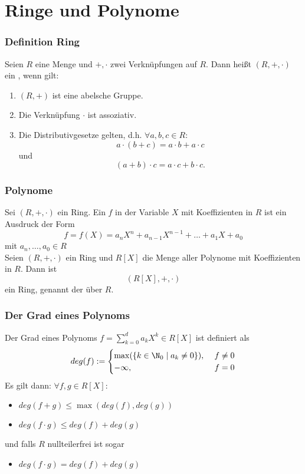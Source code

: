 \section{Ringe und Polynome}
%
%
\begin{frame}\frametitle{Definition Ring}
	
	Seien $R$ eine Menge und $+, \cdot$ zwei Verkn\"upfungen auf $R$. 
	Dann hei{\ss}t $(R,+,\cdot)$ ein , wenn gilt:
	\begin{enumerate}
		\item $(R,+)$ ist eine abelsche Gruppe.
		\item Die Verkn\"upfung $\cdot$ ist assoziativ.
		\item Die Distributivgesetze gelten, d.h. $\forall a,b,c \in R$:
			$$
				a\cdot (b+c) = a\cdot b + a\cdot c
			$$
			und
			$$
		 		(a+b)\cdot c = a\cdot c + b\cdot c.
			$$
	\end{enumerate}
	
\end{frame}
%
\begin{frame}\frametitle{Polynome}
Sei $(R,+,\cdot)$ ein Ring. Ein  $f$ in der Variable $X$ mit Koeffizienten in $R$ ist ein Ausdruck der Form
	$$
		f = f(X) = a_nX^n + a_{n-1}X^{n-1} + \ldots + a_1X + a_0 
	$$
	mit $a_n,\ldots, a_0 \in R$\\
	Seien $(R,+,\cdot)$ ein Ring und $R[X]$ die Menge aller Polynome mit Koeffizienten in $R$. Dann ist
	$$
		(R[X],+,\cdot)
	$$
	ein Ring, genannt der  über $R$.
\end{frame}
%
%
\begin{frame}\frametitle{Der Grad eines Polynoms}
Der Grad eines Polynoms $f=\sum_{k=0}^d a_kX^k \in R[X]$ ist definiert als
$$
deg(f):=\begin{cases} \max(\{k \in \N_0 \mid a_k\ne 0\}), \ & f\ne 0 \\
						- \infty, & f=0 \end{cases}
$$\pause\vfill
Es gilt dann: $\forall f,g \in R[X]:$
\begin{itemize}
\item $deg(f+g)\le \max(deg(f),deg(g))$ 
\item $deg(f\cdot g)\le deg(f)+deg(g)$ 
\end{itemize}
\vfill
und falls $R$ nullteilerfrei ist sogar
\begin{itemize}
\item $deg(f\cdot g)= deg(f)+deg(g)$
\end{itemize}
\end{frame}
